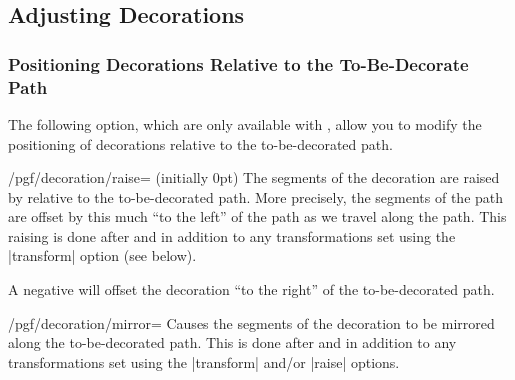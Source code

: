 \subsection{Adjusting Decorations}

\label{section-decorations-adjust}

\subsubsection{Positioning Decorations Relative to the To-Be-Decorate Path}

The following option, which are only available with \tikzname, allow
you to modify the positioning of decorations relative to the
to-be-decorated path.

\begin{key}{/pgf/decoration/raise= (initially 0pt)}
  The segments of the decoration are raised by 
  relative to the to-be-decorated path. More precisely, the segments
  of the path are offset by this much ``to the left'' of the path as
  we travel along the path. This raising is done after and in addition
  to any transformations set using the |transform| option (see below).

  A negative  will offset the decoration ``to the
  right'' of the to-be-decorated path.
\begin{codeexample}[]
\end{codeexample}
\end{key}

\begin{key}{/pgf/decoration/mirror=}
  Causes the segments of the decoration to be mirrored along the
  to-be-decorated path. This is done after and in addition to any
  transformations set using the |transform| and/or |raise| options.
\begin{codeexample}[]
\end{codeexample}
\end{key}


